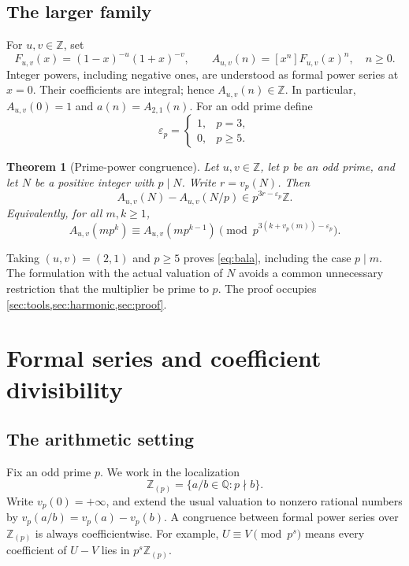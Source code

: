 \documentclass[11pt,a4paper]{article}
\numberwithin{equation}{section}
\newtheorem{theorem}{Theorem}[section]
\theoremstyle{definition}
\theoremstyle{remark}
\newcommand{\Z}{\mathbb Z}
\newcommand{\Q}{\mathbb Q}
\newcommand{\Zp}{\Z_{(p)}}
\newcommand{\vp}{v_p}
\newcommand{\epsp}{\varepsilon_p}
\newcommand{\Auv}{A_{u,v}}
\newcommand{\Fp}{F_{u,v}}
\begin{document}
\subsection{The larger family}

For $u,v\in\Z$, set
\begin{equation}\label{eq:family}
 \Fp(x)=(1-x)^{-u}(1+x)^{-v},\qquad
 \Auv(n)=[x^n]\Fp(x)^n,\quad n\geq0.
\end{equation}
Integer powers, including negative ones, are understood as formal power
series at $x=0$. Their coefficients are integral; hence
$\Auv(n)\in\Z$. In particular, $\Auv(0)=1$ and $a(n)=A_{2,1}(n)$.
For an odd prime define
\begin{equation}\label{eq:epsilon}
 \epsp=\begin{cases}1,&p=3,\\0,&p\geq5.\end{cases}
\end{equation}

\begin{theorem}[Prime-power congruence]\label{thm:main}
Let $u,v\in\Z$, let $p$ be an odd prime, and let $N$ be a positive integer
with $p\mid N$. Write $r=\vp(N)$. Then
\begin{equation}\label{eq:main}
 \Auv(N)-\Auv(N/p)\in p^{3r-\epsp}\Z.
\end{equation}
Equivalently, for all $m,k\geq1$,
\begin{equation}\label{eq:strong-m}
 \Auv(mp^k)\equiv\Auv(mp^{k-1})
 \pmod{p^{3(k+\vp(m))-\epsp}}.
\end{equation}
\end{theorem}

Taking $(u,v)=(2,1)$ and $p\geq5$ proves \eqref{eq:bala}, including the
case $p\mid m$. The formulation with the actual valuation of $N$ avoids
a common unnecessary restriction that the multiplier be prime to $p$.
The proof occupies \cref{sec:tools,sec:harmonic,sec:proof}.

\section{Formal series and coefficient divisibility}\label{sec:tools}

\subsection{The arithmetic setting}

Fix an odd prime $p$. We work in the localization
\[
 \Zp=\{a/b\in\Q:p\nmid b\}.
\]
Write $\vp(0)=+\infty$, and extend the usual valuation to nonzero rational
numbers by $\vp(a/b)=\vp(a)-\vp(b)$. A congruence between formal power
series over $\Zp$ is always coefficientwise. For example,
$U\equiv V\pmod{p^s}$ means every coefficient of $U-V$ lies in
$p^s\Zp$.
\end{document}
